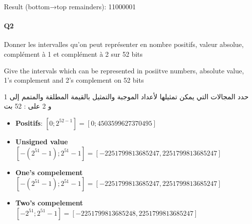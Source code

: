 

Result (bottom→top remainders): 11000001




\paragraph{Q2}

Donner les intervalles qu'on peut représenter en nombre positifs, valeur absolue, complément à 1 et complément à 2  sur 52 bits

Give the intervals which can be represented in posiitve numbers, absolute value, 1's complement and 2's complement on 52 bits

\begin{arab}[utf]
حدد المجالات التي يمكن تمثيلها لأعداد الموجبة والتمثيل بالقيمة المطلقة والمتمم إلى 1 و 2 على   : 52 بت
\end{arab}

\begin{itemize}
\item \textbf{Positifs}: $[0; 2^{ 52-1 }] = [0; 4503599627370495]$
\item \textbf{Unsigned value} $[-(2^{ 51 }-1 );2^{ 51 }-1] = [-2251799813685247, 2251799813685247]$
\item \textbf{One's compelement} $[-(2^{ 51 }-1 );2^{ 51 }-1] = [-2251799813685247, 2251799813685247]$
\item \textbf{Two's compelement} $[-2^{ 51 } ;2^{ 51 }-1] = [-2251799813685248, 2251799813685247]$
\end{itemize}


